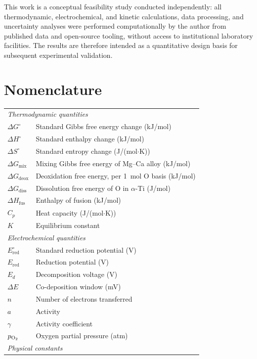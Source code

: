 \documentclass[sn-mathphys,Numbered]{sn-jnl}
\begin{document}
This work is a conceptual feasibility study conducted independently: all thermodynamic, electrochemical, and kinetic calculations, data processing, and uncertainty analyses were performed computationally by the author from published data and open-source tooling, without access to institutional laboratory facilities. The results are therefore intended as a quantitative design basis for subsequent experimental validation.

\section*{Nomenclature}

\begin{tabular}{ll}
\multicolumn{2}{l}{\textit{Thermodynamic quantities}} \\
$\Delta G^{\circ}$ & Standard Gibbs free energy change (kJ/mol) \\
$\Delta H^{\circ}$ & Standard enthalpy change (kJ/mol) \\
$\Delta S^{\circ}$ & Standard entropy change (J/(mol$\cdot$K)) \\
$\Delta G_{\mathrm{mix}}$ & Mixing Gibbs free energy of Mg--Ca alloy (kJ/mol) \\
$\Delta G_{\mathrm{deox}}$ & Deoxidation free energy, per 1~mol O basis (kJ/mol) \\
$\Delta G_{\mathrm{diss}}$ & Dissolution free energy of O in $\alpha$-Ti (J/mol) \\
$\Delta H_{\mathrm{fus}}$ & Enthalpy of fusion (kJ/mol) \\
$C_p$ & Heat capacity (J/(mol$\cdot$K)) \\
$K$ & Equilibrium constant \\
\multicolumn{2}{l}{\textit{Electrochemical quantities}} \\
$E^{\circ}_{\mathrm{red}}$ & Standard reduction potential (V) \\
$E_{\mathrm{red}}$ & Reduction potential (V) \\
$E_d$ & Decomposition voltage (V) \\
$\Delta E$ & Co-deposition window (mV) \\
$n$ & Number of electrons transferred \\
$a$ & Activity \\
$\gamma$ & Activity coefficient \\
$p_{\ce{O2}}$ & Oxygen partial pressure (atm) \\
\multicolumn{2}{l}{\textit{Physical constants}} \\

\end{tabular}
\end{document}
